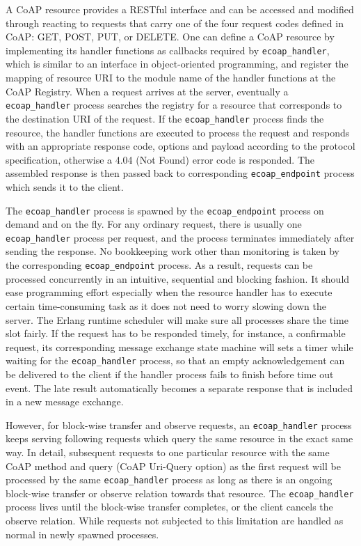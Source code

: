 A CoAP resource provides a RESTful interface and can be accessed and modified through reacting to requests that carry one of the four request codes defined in CoAP: GET, POST, PUT, or DELETE. One can define a CoAP resource by implementing its handler functions as callbacks required by \verb|ecoap_handler|, which is similar to an interface in object-oriented programming, and register the mapping of resource URI to the module name of the handler functions at the CoAP Registry. When a request arrives at the server, eventually a \verb|ecoap_handler| process searches the registry for a resource that corresponds to the destination URI of the request. If the \verb|ecoap_handler| process finds the resource, the handler functions are executed to process the request and responds with an appropriate response code, options and payload according to the protocol specification, otherwise a 4.04 (Not Found) error code is responded. The assembled response is then passed back to corresponding \verb|ecoap_endpoint| process which sends it to the client. 

The \verb|ecoap_handler| process is spawned by the \verb|ecoap_endpoint| process on demand and on the fly. For any ordinary request, there is usually one \verb|ecoap_handler| process per request, and the process terminates immediately after sending the response. No  bookkeeping work other than monitoring is taken by the corresponding \verb|ecoap_endpoint| process. As a result, requests can be processed concurrently in an intuitive, sequential and blocking fashion. It should ease programming effort especially when the resource handler has to execute certain time-consuming task as it does not need to worry slowing down the server. The Erlang runtime scheduler will make sure all processes share the time slot fairly. If the request has to be responded timely, for instance, a confirmable request, its corresponding message exchange state machine will sets a timer while waiting for the \verb|ecoap_handler| process, so that an empty acknowledgement can be delivered to the client if the handler process fails to finish before time out event. The late result automatically becomes a separate response that is included in a new message exchange. 

However, for block-wise transfer and observe requests, an \verb|ecoap_handler| process keeps serving following requests which query the same resource in the exact same way. In detail, subsequent requests to one particular resource with the same CoAP method and query (CoAP Uri-Query option) as the first request will be processed by the same \verb|ecoap_handler| process as long as there is an ongoing block-wise transfer or observe relation towards that resource. The \verb|ecoap_handler| process lives until the block-wise transfer completes, or the client cancels the observe relation. While requests not subjected to this limitation are handled as normal in newly spawned processes.

